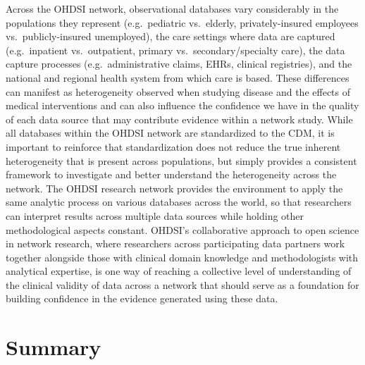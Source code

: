 \documentclass[11pt]{book}
\theoremstyle{definition}
\theoremstyle{definition}
\theoremstyle{definition}
\theoremstyle{remark}
\begin{document}
Across the OHDSI network, observational databases vary considerably in
the populations they represent (e.g.~pediatric vs.~elderly,
privately-insured employees vs.~publicly-insured unemployed), the care
settings where data are captured (e.g.~inpatient vs.~outpatient, primary
vs.~secondary/specialty care), the data capture processes
(e.g.~administrative claims, EHRs, clinical registries), and the
national and regional health system from which care is based. These
differences can manifest as heterogeneity observed when studying disease
and the effects of medical interventions and can also influence the
confidence we have in the quality of each data source that may
contribute evidence within a network study. While all databases within
the OHDSI network are standardized to the CDM, it is important to
reinforce that standardization does not reduce the true inherent
heterogeneity that is present across populations, but simply provides a
consistent framework to investigate and better understand the
heterogeneity across the network. The OHDSI research network provides
the environment to apply the same analytic process on various databases
across the world, so that researchers can interpret results across
multiple data sources while holding other methodological aspects
constant. OHDSI's collaborative approach to open science in network
research, where researchers across participating data partners work
together alongside those with clinical domain knowledge and
methodologists with analytical expertise, is one way of reaching a
collective level of understanding of the clinical validity of data
across a network that should serve as a foundation for building
confidence in the evidence generated using these data.

\section{Summary}\label{summary-11}
\end{document}
